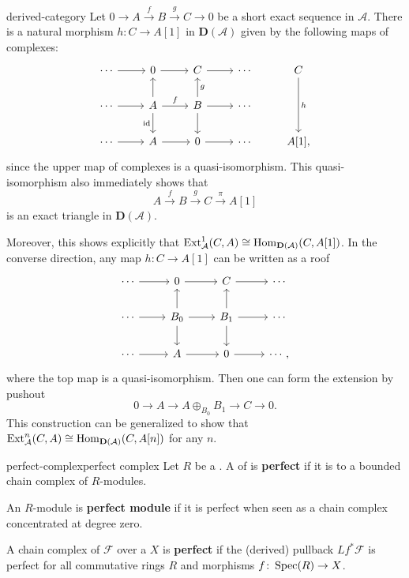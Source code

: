 \begin{example}{derived-category}
    Let $0 \to A \xrightarrow{f} B \xrightarrow{g} C \to 0$ be a short exact sequence in $\mathcal{A}$. There is a natural morphism $h \colon C \to A[1]$ in $\textbf{D}(\mathcal{A})$ given by the following maps of complexes:
    \[ \svg \begin{tikzcd} \cdots \arrow{r} & 0 \arrow{r} & C \arrow{r} & \cdots & C \arrow{dd}{h} \\ \cdots \arrow{r} & A \arrow{u} \arrow[swap]{d}{\id} \arrow{r}{f} & B \arrow{d} \arrow[swap]{u}{g} \arrow{r} & \cdots & \\ \cdots \arrow{r} & A \arrow{r} & 0 \arrow{r} & \cdots & A[1] , \end{tikzcd} \]
    since the upper map of complexes is a quasi-isomorphism. This quasi-isomorphism also immediately shows that
    \[ A \xrightarrow{f} B \xrightarrow{g} C \xrightarrow{\pi} A[1] \]
    is an exact triangle in $\textbf{D}(\mathcal{A})$.
    
    Moreover, this shows explicitly that $\textup{Ext}_\mathcal{A}^1(C, A) \cong \operatorname{Hom}_{\textbf{D}(\mathcal{A})}(C, A[1])$. In the converse direction, any map $h \colon C \to A[1]$ can be written as a roof
    \[ \svg \begin{tikzcd} \cdots \arrow{r} & 0 \arrow{r} & C \arrow{r} & \cdots \\ \cdots \arrow{r} & B_0 \arrow{u} \arrow{d} \arrow{r} & B_1 \arrow{d} \arrow{u} \arrow{r} & \cdots \\ \cdots \arrow{r} & A \arrow{r} & 0 \arrow{r} & \cdots , \end{tikzcd} \]
    where the top map is a quasi-isomorphism. Then one can form the extension by pushout 
    \[ 0 \to A \to A \oplus_{B_0} B_1 \to C \to 0 . \]
    This construction can be generalized to show that $\textup{Ext}_{\mathcal{A}}^n(C, A) \cong \operatorname{Hom}_{\textbf{D}(\mathcal{A})}(C, A[n])$ for any $n$.
\end{example}

    

\begin{topic}{perfect-complex}{perfect complex}
    Let $R$ be a . A  of  is \textbf{perfect} if it is  to a bounded chain complex of   $R$-modules.
    
    An $R$-module is \textbf{perfect module} if it is perfect when seen as a chain complex concentrated at degree zero.
    
    A chain complex of  $\mathcal{F}$ over a  $X$ is \textbf{perfect} if the (derived) pullback $L f^* \mathcal{F}$ is perfect for all commutative rings $R$ and morphisms $f \colon \operatorname{Spec}(R) \to X$.
\end{topic}

